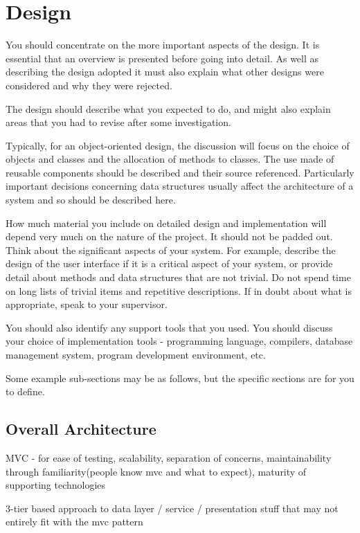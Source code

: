 \chapter{Design}

You should concentrate on the more important aspects of the design. It is essential that an overview is presented before going into detail. As well as describing the design adopted it must also explain what other designs were considered and why they were rejected.

The design should describe what you expected to do, and might also explain areas that you had to revise after some investigation.

Typically, for an object-oriented design, the discussion will focus on the choice of objects and classes and the allocation of methods to classes. The use made of reusable components should be described and their source referenced. Particularly important decisions concerning data structures usually affect the architecture of a system and so should be described here.

How much material you include on detailed design and implementation will depend very much on the nature of the project. It should not be padded out. Think about the significant aspects of your system. For example, describe the design of the user interface if it is a critical aspect of your system, or provide detail about methods and data structures that are not trivial. Do not spend time on long lists of trivial items and repetitive descriptions. If in doubt about what is appropriate, speak to your supervisor.
 
You should also identify any support tools that you used. You should discuss your choice of implementation tools - programming language, compilers, database management system, program development environment, etc.

Some example sub-sections may be as follows, but the specific sections are for you to define. 

\section{Overall Architecture}

MVC - for ease of testing, scalability, separation of concerns, maintainability through familiarity(people know mvc and what to expect), maturity of supporting technologies

3-tier based approach to data layer / service / presentation stuff that may not entirely fit with the mvc pattern


